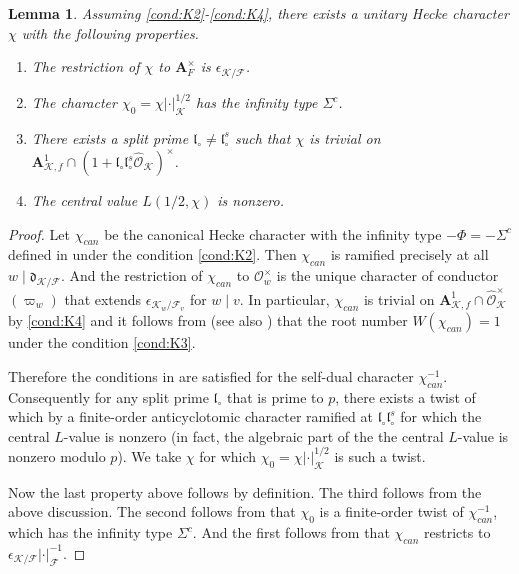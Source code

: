 \documentclass[leqno]{amsart}
\newtheorem{lem}[thm]{Lemma}
\theoremstyle{definition}
\theoremstyle{remark}
\newcommand{\oo}{\mathcal{O}}
\newcommand{\A}{\mathbf A}
\newcommand{\fl}{\mathfrak{l}}
\newcommand{\F}{{\mathcal{F}}} %
\newcommand{\K}{{\mathcal{K}}} %
\newcommand{\qch}{\epsilon} %
\begin{document}
\begin{lem}
Assuming \ref{cond:K2}-\ref{cond:K4},
there exists a unitary Hecke character $\chi$
with the following properties.
\begin{enumerate}
\item The restriction of $\chi$ to $\A_F^\times$ is $\qch_{\K/\F}$.
\item The character $\chi_0=\chi|\cdot|^{1/2}_\K$
has the infinity type $\Sigma^c$.
\item There exists a split prime $\fl_\circ\neq \fl_\circ^s$
such that $\chi$ is trivial on 
$\A_{\K,f}^1\cap (1+\fl_\circ\fl_\circ^s\widehat{\oo}_\K)^\times$.
\item The central value $L(1/2,\chi)$ is nonzero.
\end{enumerate}
\end{lem}
\begin{proof}

Let $\chi_{can}$
be the canonical Hecke character 
with the infinity type $-\Phi=-\Sigma^c$
defined in \cite{Rohrlich} 
under the condition \ref{cond:K2}.
Then $\chi_{can}$ 
is ramified precisely at all $w\mid \mathfrak{d}_{\K/\F}$.
And the restriction of $\chi_{can}$ to $\oo_w^\times$
is the unique character 
of conductor $(\varpi_w)$ 
that extends $\qch_{\K_w/\F_v}$ for $w\mid v$.
In particular,
$\chi_{can}$ is trivial 
on $\A_{\K,f}^1\cap \widehat{\oo}_\K^\times$
by \ref{cond:K4}
and it follows from \cite[\S 8]{Rohrlich}
(see also \cite[Lem 2.1]{Rod})
that the root number $W(\chi_{can})=1$
under the condition \ref{cond:K3}.

Therefore the conditions in
\cite[Thm A]{Hsieh2012}
are satisfied for the self-dual character
$\chi_{can}^{-1}$.
Consequently for any split prime $\fl_\circ$
that is prime to $p$, there exists 
a twist of which by a finite-order 
anticyclotomic character
ramified at $\fl_\circ\fl^s_\circ$
for which the central $L$-value is nonzero
(in fact, the algebraic part of the 
the central $L$-value is nonzero modulo $p$).
We take $\chi$
for which $\chi_0=\chi|\cdot|^{1/2}_\K$
is such a twist.

Now the last property above follows by definition.
The third follows from the above discussion.
The second follows from that 
$\chi_0$ is a finite-order twist of $\chi_{can}^{-1}$,
which has the infinity type $\Sigma^c$.
And the first follows from that 
$\chi_{can}$ restricts to $\qch_{\K/\F}|\cdot|^{-1}_\F$.
\end{proof}
\end{document}
